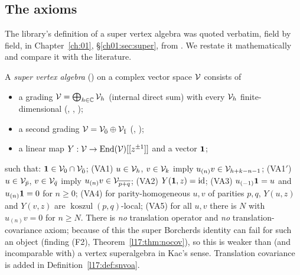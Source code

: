 \subsection{The axioms}

The library's definition of a super vertex algebra was quoted verbatim, field by field, in
Chapter~\ref{ch:01}, §\ref{ch01:sec:super}, from . We restate it mathematically and compare it with the literature.

\begin{definition}\label{l17:def:sva}
A \emph{super vertex algebra} () on a complex vector space $\mathcal{V}$
consists of
\begin{itemize}
\item a grading $\mathcal{V}=\bigoplus_{h\in{\mathbb{C}}}\mathcal{V}_h$ (internal direct sum) with every
  $\mathcal{V}_h$ finite-dimensional (, , );
\item a second grading $\mathcal{V}=\mathcal{V}_{\bar0}\oplus\mathcal{V}_{\bar1}$ (,
  );
\item a linear map $Y:\mathcal{V}\to\operatorname{End}(\mathcal{V})[[z^{\pm1}]]$ and a vector $\mathbf{1}$;
\end{itemize}
such that: $\mathbf{1}\in\mathcal{V}_0\cap\mathcal{V}_{\bar0}$; (VA1) $u\in\mathcal{V}_h$,
$v\in\mathcal{V}_k$ imply $u_{(n)}v\in\mathcal{V}_{h+k-n-1}$; (VA1$'$) $u\in\mathcal{V}_{\bar p}$,
$v\in\mathcal{V}_{\bar q}$ imply $u_{(n)}v\in\mathcal{V}_{\overline{p+q}}$; (VA2)
$Y(\mathbf{1},z)=\mathrm{id}$; (VA3) $u_{(-1)}\mathbf{1}=u$ and $u_{(n)}\mathbf{1}=0$ for
$n\ge0$; (VA4) for parity-homogeneous $u,v$ of parities $p,q$, $Y(u,z)$ and $Y(v,z)$ are
$\operatorname{koszul}(p,q)$-local; (VA5) for all $u,v$ there is $N$ with $u_{(n)}v=0$ for $n\ge N$.
There is \emph{no} translation operator and \emph{no} translation-covariance axiom; because of this the
super Borcherds identity can fail for such an object (finding (F2), Theorem~\ref{l17:thm:nocov}), so
this is weaker than (and incomparable with) a vertex superalgebra in Kac's sense. Translation
covariance is added in Definition~\ref{l17:def:snvoa}.
\end{definition}
